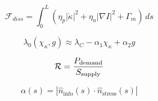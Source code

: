 
\begin{equation}
\mathcal{F}_{diss} = \int_0^L \left( \eta_p |\dot{\kappa}|^2 + \eta_a |\nabla I|^2 + \Gamma_m \right)\, ds
\label{eq:dissipation}
\end{equation}

\begin{equation}
\lambda_0(\chi_\kappa, g) \approx \lambda_{C} - \alpha_1 \chi_\kappa + \alpha_2 g
\label{eq:mode_selection}
\end{equation}

\begin{equation}
\mathcal{R} = \frac{P_{\mathrm{demand}}}{S_{\mathrm{supply}}}
\label{eq:instability_ratio}
\end{equation}

\begin{equation}
\alpha(s) = \left| \hat{n}_{\mathrm{info}}(s) \cdot \hat{n}_{\mathrm{stress}}(s) \right|
\label{eq:alignment_param}
\end{equation}
